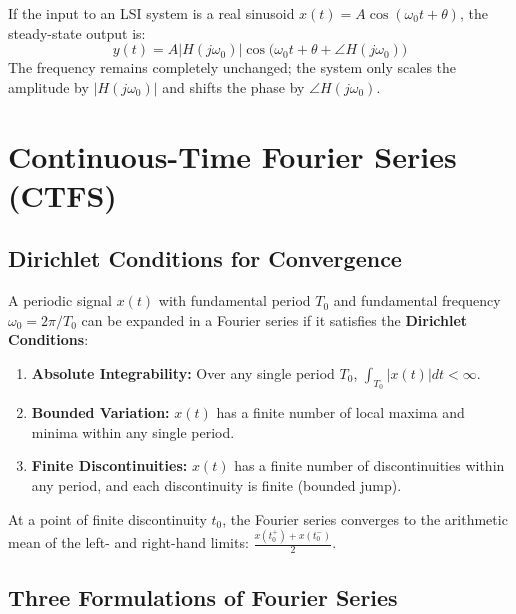 \documentclass[12pt,a4paper]{article}
\begin{document}
\begin{tcolorbox}[examplebox, title={\textbf{Sinusoidal Steady-State Response}}]
If the input to an LSI system is a real sinusoid $x(t) = A \cos(\omega_0 t + \theta)$, the steady-state output is:
\begin{equation}
  y(t) = A |H(j\omega_0)| \cos\big(\omega_0 t + \theta + \angle H(j\omega_0)\big)
\end{equation}
The frequency remains completely unchanged; the system only scales the amplitude by $|H(j\omega_0)|$ and shifts the phase by $\angle H(j\omega_0)$.
\end{tcolorbox}

\section{Continuous-Time Fourier Series (CTFS)}

\subsection{Dirichlet Conditions for Convergence}
A periodic signal $x(t)$ with fundamental period $T_0$ and fundamental frequency $\omega_0 = 2\pi / T_0$ can be expanded in a Fourier series if it satisfies the \textbf{Dirichlet Conditions}:
\begin{enumerate}[topsep=2pt, itemsep=2pt]
  \item \textbf{Absolute Integrability:} Over any single period $T_0$, $\int_{T_0} |x(t)| dt < \infty$.
  \item \textbf{Bounded Variation:} $x(t)$ has a finite number of local maxima and minima within any single period.
  \item \textbf{Finite Discontinuities:} $x(t)$ has a finite number of discontinuities within any period, and each discontinuity is finite (bounded jump).
\end{enumerate}
At a point of finite discontinuity $t_0$, the Fourier series converges to the arithmetic mean of the left- and right-hand limits: $\frac{x(t_0^+) + x(t_0^-)}{2}$.

\subsection{Three Formulations of Fourier Series}
\end{document}
